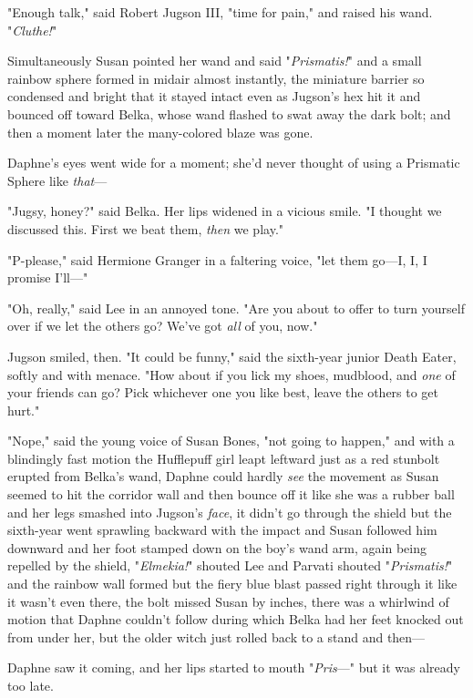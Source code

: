 "Enough talk," said Robert Jugson III, "time for pain," and raised his wand.
"\emph{Cluthe!}"

Simultaneously Susan pointed her wand and said "\emph{Prismatis!}" and a small
rainbow sphere formed in midair almost instantly, the miniature barrier so
condensed and bright that it stayed intact even as Jugson's hex hit it and
bounced off toward Belka, whose wand flashed to swat away the dark bolt; and
then a moment later the many-colored blaze was gone.

Daphne's eyes went wide for a moment; she'd never thought of using a Prismatic
Sphere like \emph{that}—

"Jugsy, honey?" said Belka. Her lips widened in a vicious smile. "I thought we
discussed this. First we beat them, \emph{then} we play."

"P-please," said Hermione Granger in a faltering voice, "let them go—I, I, I
promise I'll—"

"Oh, really," said Lee in an annoyed tone. "Are you about to offer to turn
yourself over if we let the others go? We've got \emph{all} of you, now."

Jugson smiled, then. "It could be funny," said the sixth-year junior Death
Eater, softly and with menace. "How about if you lick my shoes, mudblood, and
\emph{one} of your friends can go? Pick whichever one you like best, leave the
others to get hurt."

"Nope," said the young voice of Susan Bones, "not going to happen," and with a
blindingly fast motion the Hufflepuff girl leapt leftward just as a red
stunbolt erupted from Belka's wand, Daphne could hardly \emph{see} the movement
as Susan seemed to hit the corridor wall and then bounce off it like she was a
rubber ball and her legs smashed into Jugson's \emph{face}, it didn't go
through the shield but the sixth-year went sprawling backward with the impact
and Susan followed him downward and her foot stamped down on the boy's wand
arm, again being repelled by the shield, "\emph{Elmekia!}" shouted Lee and
Parvati shouted "\emph{Prismatis!}" and the rainbow wall formed but the fiery
blue blast passed right through it like it wasn't even there, the bolt missed
Susan by inches, there was a whirlwind of motion that Daphne couldn't follow
during which Belka had her feet knocked out from under her, but the older witch
just rolled back to a stand and then—

Daphne saw it coming, and her lips started to mouth "\emph{Pris}—" but it was
already too late.

